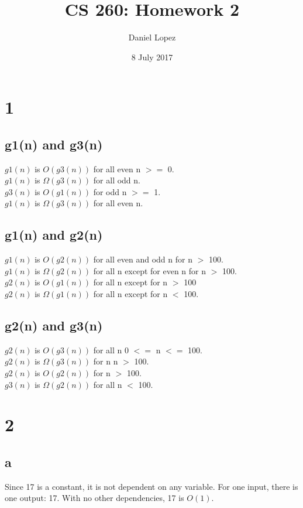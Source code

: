 \documentclass{article}
\begin{document}
\title{CS 260: Homework 2}
\author{Daniel Lopez}
\maketitle

\date{8 July 2017}

\section{1}
\subsection{g1(n) and g3(n)}
$g1(n)$ is $O(g3(n))$ for all even n $>=$ 0.\\
$g1(n)$ is $\Omega(g3(n))$ for all odd n.\\
$g3(n)$ is $O(g1(n))$ for odd n $>=$ 1.\\
$g1(n)$ is $\Omega(g3(n))$ for all even n.\\ 
\subsection{g1(n) and g2(n)}
\par$g1(n)$ is $O(g2(n))$ for all even and odd n for n $>$ 100.\\
$g1(n)$ is $\Omega(g2(n))$ for all n except for even n for n $>$ 100.\\
$g2(n)$ is $O(g1(n))$ for all n except for n $>$ 100\\
$g2(n)$ is $\Omega(g1(n))$ for all n except for n $<$ 100.
\subsection{g2(n) and g3(n)}
\par $g2(n)$ is $O(g3(n))$ for all n 0 $<=$ n $<=$ 100.\\
$g2(n)$ is $\Omega(g3(n))$ for n n $>$ 100.\\
$g2(n)$ is $O(g2(n))$ for n $>$ 100.\\
$g3(n)$ is $\Omega(g2(n))$ for all n $<$ 100.\\

\section{2}
\subsection{a}
Since 17 is a constant, it is not dependent on any variable. For one input, there is one output: 17. With no other dependencies, 17 is $O(1)$.
\end{document}
